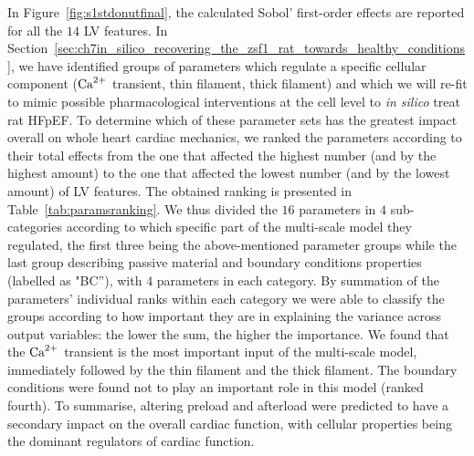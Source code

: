 \vspace{0.2cm}
In Figure~\ref{fig:s1stdonutfinal}, the calculated Sobol' first-order effects are reported for all the $14$ LV features. In Section~\ref{sec:ch7in_silico_recovering_the_zsf1_rat_towards_healthy_conditions}, we have identified groups of parameters which regulate a specific cellular component ($\textrm{Ca}^{2+}$ transient, thin filament, thick filament) and which we will re-fit to mimic possible pharmacological interventions at the cell level to \textit{in silico} treat rat HFpEF. To determine which of these parameter sets has the greatest impact overall on whole heart cardiac mechanics, we ranked the parameters according to their total effects from the one that affected the highest number (and by the highest amount) to the one that affected the lowest number (and by the lowest amount) of LV features. The obtained ranking is presented in Table~\ref{tab:paramsranking}. We thus divided the $16$ parameters in $4$ sub-categories according to which specific part of the multi-scale model they regulated, the first three being the above-mentioned parameter groups while the last group describing passive material and boundary conditions properties (labelled as "BC''), with $4$ parameters in each category. By summation of the parameters' individual ranks within each category we were able to classify the groups according to how important they are in explaining the variance across output variables: the lower the sum, the higher the importance. We found that the $\textrm{Ca}^{2+}$ transient is the most important input of the multi-scale model, immediately followed by the thin filament and the thick filament. The boundary conditions were found not to play an important role in this model (ranked fourth). To summarise, altering preload and afterload were predicted to have a secondary impact on the overall cardiac function, with cellular properties being the dominant regulators of cardiac function.


